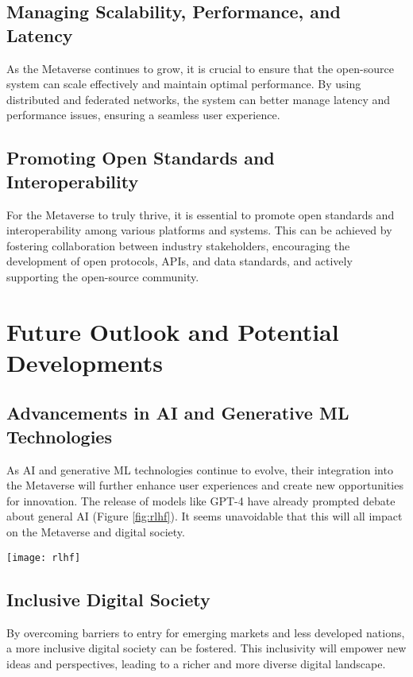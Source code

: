 \subsection{Managing Scalability, Performance, and Latency}
As the Metaverse continues to grow, it is crucial to ensure that the open-source system can scale effectively and maintain optimal performance. By using distributed and federated networks, the system can better manage latency and performance issues, ensuring a seamless user experience.

\subsection{Promoting Open Standards and Interoperability}
For the Metaverse to truly thrive, it is essential to promote open standards and interoperability among various platforms and systems. This can be achieved by fostering collaboration between industry stakeholders, encouraging the development of open protocols, APIs, and data standards, and actively supporting the open-source community.

\section{Future Outlook and Potential Developments}
\subsection{Advancements in AI and Generative ML Technologies}
As AI and generative ML technologies continue to evolve, their integration into the Metaverse will further enhance user experiences and create new opportunities for innovation. The release of models like GPT-4 have already prompted debate about general AI \cite{bubeck2023sparks, perez2022discovering} (Figure \ref{fig:rlhf}). It seems unavoidable that this will all impact on the Metaverse and digital society.

\begin{figure*}[ht]\centering 	\texttt{[image: rlhf]}
	\caption{Models exhibit uncanny behaviours.}
	\label{fig:rlhf}
\end{figure*}


\subsection{Inclusive Digital Society}
By overcoming barriers to entry for emerging markets and less developed nations, a more inclusive digital society can be fostered. This inclusivity will empower new ideas and perspectives, leading to a richer and more diverse digital landscape.

